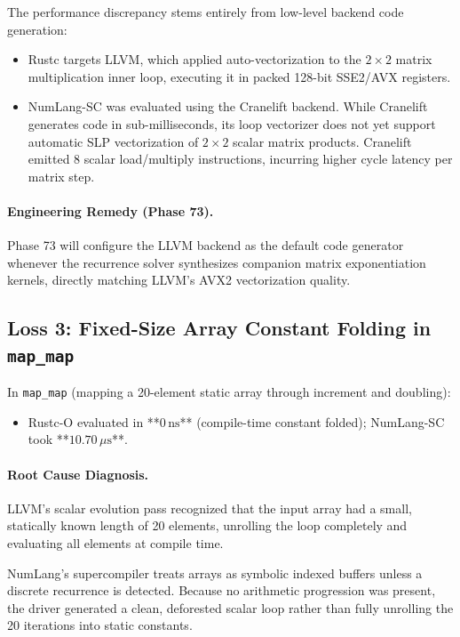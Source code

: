 The performance discrepancy stems entirely from low-level backend code generation:
\begin{itemize}
    \item Rustc targets LLVM, which applied auto-vectorization to the $2 \times 2$ matrix multiplication inner loop, executing it in packed 128-bit SSE2/AVX registers.
    \item NumLang-SC was evaluated using the Cranelift backend. While Cranelift generates code in sub-milliseconds, its loop vectorizer does not yet support automatic SLP vectorization of $2 \times 2$ scalar matrix products. Cranelift emitted 8 scalar load/multiply instructions, incurring higher cycle latency per matrix step.
\end{itemize}

\paragraph{Engineering Remedy (Phase 73).}
Phase 73 will configure the LLVM backend as the default code generator whenever the recurrence solver synthesizes companion matrix exponentiation kernels, directly matching LLVM's AVX2 vectorization quality.

\subsection{Loss 3: Fixed-Size Array Constant Folding in \texttt{map\_map}}
In \texttt{map\_map} (mapping a 20-element static array through increment and doubling):
\begin{itemize}
    \item Rustc-O evaluated in **$0\,\text{ns}$** (compile-time constant folded); NumLang-SC took **$10.70\,\mu\text{s}$**.
\end{itemize}

\paragraph{Root Cause Diagnosis.}
LLVM's scalar evolution pass recognized that the input array had a small, statically known length of 20 elements, unrolling the loop completely and evaluating all elements at compile time.

NumLang's supercompiler treats arrays as symbolic indexed buffers unless a discrete recurrence is detected. Because no arithmetic progression was present, the driver generated a clean, deforested scalar loop rather than fully unrolling the 20 iterations into static constants.

